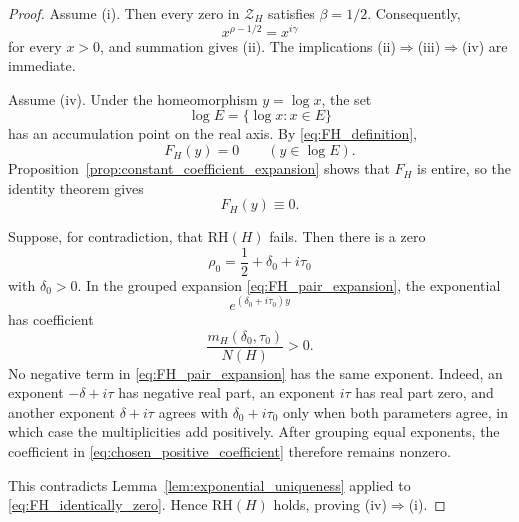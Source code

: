 \documentclass[11pt]{amsart}
\numberwithin{equation}{section}
\theoremstyle{plain}
\theoremstyle{definition}
\theoremstyle{remark}
\newcommand{\RH}{\mathrm{RH}}
\begin{document}
\begin{proof}
Assume (i).  Then every zero in $\mathcal Z_H$ satisfies $\beta=1/2$.  Consequently,
\begin{equation}
x^{\rho-1/2}=x^{i\gamma}
\label{eq:termwise_RH_equality}
\end{equation}
for every $x>0$, and summation gives (ii).  The implications (ii)$\Rightarrow$(iii)$\Rightarrow$(iv) are immediate.

Assume (iv).  Under the homeomorphism $y=\log x$, the set
\begin{equation}
\log E=\{\log x:x\in E\}
\label{eq:log_E}
\end{equation}
has an accumulation point on the real axis.  By \eqref{eq:FH_definition},
\begin{equation}
F_H(y)=0
\qquad(y\in\log E).
\label{eq:FH_zero_on_logE}
\end{equation}
Proposition~\ref{prop:constant_coefficient_expansion} shows that $F_H$ is entire, so the identity theorem gives
\begin{equation}
F_H(y)\equiv0.
\label{eq:FH_identically_zero}
\end{equation}

Suppose, for contradiction, that $\RH(H)$ fails.  Then there is a zero
\begin{equation}
\rho_0=\frac12+\delta_0+i\tau_0
\label{eq:chosen_offline_zero}
\end{equation}
with $\delta_0>0$.  In the grouped expansion \eqref{eq:FH_pair_expansion}, the exponential
\begin{equation}
e^{(\delta_0+i\tau_0)y}
\label{eq:chosen_exponential}
\end{equation}
has coefficient
\begin{equation}
\frac{m_H(\delta_0,\tau_0)}{N(H)}>0.
\label{eq:chosen_positive_coefficient}
\end{equation}
No negative term in \eqref{eq:FH_pair_expansion} has the same exponent.  Indeed, an exponent $-\delta+i\tau$ has negative real part, an exponent $i\tau$ has real part zero, and another exponent $\delta+i\tau$ agrees with $\delta_0+i\tau_0$ only when both parameters agree, in which case the multiplicities add positively.  After grouping equal exponents, the coefficient in \eqref{eq:chosen_positive_coefficient} therefore remains nonzero.

This contradicts Lemma~\ref{lem:exponential_uniqueness} applied to \eqref{eq:FH_identically_zero}.  Hence $\RH(H)$ holds, proving (iv)$\Rightarrow$(i).
\end{proof}
\end{document}
